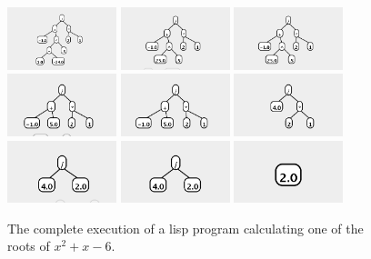 \documentclass{article}
\begin{document}
\begin{figure}
\begin{center}
\includegraphics[width=1.25in]{../board/pics/qf2151.png}
\includegraphics[width=1.25in]{../board/pics/qf2251.png}
\includegraphics[width=1.25in]{../board/pics/qf2301.png}
\includegraphics[width=1.25in]{../board/pics/qf2351.png}
\includegraphics[width=1.25in]{../board/pics/qf2401.png}
\includegraphics[width=1.25in]{../board/pics/qf2551.png}
\includegraphics[width=1.25in]{../board/pics/qf2601.png}
\includegraphics[width=1.25in]{../board/pics/qf2701.png}
\includegraphics[width=1.25in]{../board/pics/qf2801.png}
\end{center}
\caption{The complete execution of a lisp program calculating one of the roots of $x^2+x-6$.}
\end{figure}
\end{document}
